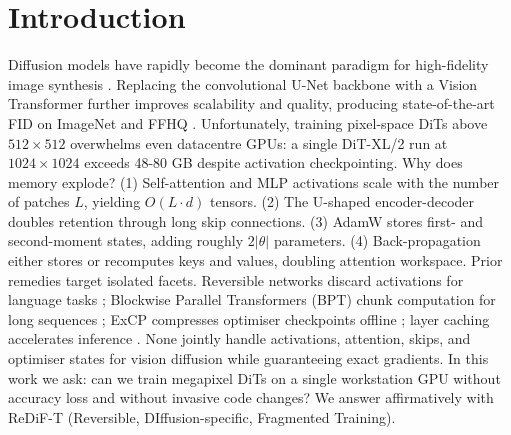 \documentclass{article}
\begin{document}
\section{Introduction}
Diffusion models have rapidly become the dominant paradigm for high-fidelity image synthesis \cite{ho-2020-denoising,rombach-2021-high}. Replacing the convolutional U-Net backbone with a Vision Transformer further improves scalability and quality, producing state-of-the-art FID on ImageNet and FFHQ \cite{peebles-2022-scalable,crowson-2024-scalable}. Unfortunately, training pixel-space DiTs above \(512\times512\) overwhelms even datacentre GPUs: a single DiT-XL/2 run at \(1024\times1024\) exceeds 48-80 GB despite activation checkpointing.
Why does memory explode? (1) Self-attention and MLP activations scale with the number of patches \(L\), yielding \(O(L\cdot d)\) tensors. (2) The U-shaped encoder-decoder doubles retention through long skip connections. (3) AdamW stores first- and second-moment states, adding roughly \(2\lvert\theta\rvert\) parameters. (4) Back-propagation either stores or recomputes keys and values, doubling attention workspace.
Prior remedies target isolated facets. Reversible networks discard activations for language tasks \cite{kitaev-2020-reformer}; Blockwise Parallel Transformers (BPT) chunk computation for long sequences \cite{liu-2023-blockwise}; ExCP compresses optimiser checkpoints offline \cite{li-2024-excp}; layer caching accelerates inference \cite{ma-2024-learning}. None jointly handle activations, attention, skips, and optimiser states for vision diffusion while guaranteeing exact gradients.
In this work we ask: can we train megapixel DiTs on a single workstation GPU without accuracy loss and without invasive code changes? We answer affirmatively with ReDiF-T (Reversible, DIffusion-specific, Fragmented Training).
\end{document}
